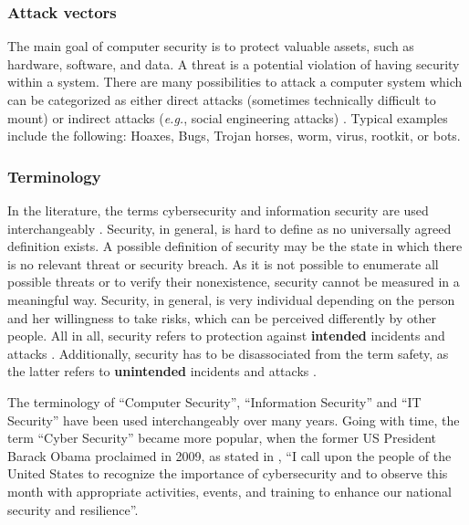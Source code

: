 \subsubsection{Attack vectors}
The main goal of computer security is to protect valuable assets, such as hardware, software, and data. A threat is a potential violation of having security within a system. There are many possibilities to attack a computer system which can be categorized as either direct attacks (sometimes technically difficult to mount) or indirect attacks (\textit{e.g.}, social engineering attacks) \cite{Bishop2003}. Typical examples include the following: Hoaxes, Bugs, Trojan horses,  worm, virus, rootkit, or bots.

\subsubsection{Terminology}
In the literature, the terms cybersecurity and information security are used interchangeably \cite{VonSolms2013}. Security, in general, is hard to define as no universally agreed definition exists. A possible definition of security may be the state in which there is no relevant threat or security breach. As it is not possible to enumerate all possible threats or to verify their nonexistence, security cannot be measured in a meaningful way. Security, in general, is very individual depending on the person and her willingness to take risks, which can be perceived differently by other people. All in all, security refers to protection against \textbf{intended} incidents and attacks \cite{Bishop2004, Pfleeger2014}. Additionally, security has to be disassociated from the term safety, as the latter refers to \textbf{unintended} incidents and attacks \cite{Bishop2004}.

The terminology of ``Computer Security'', ``Information Security'' and ``IT Security'' have been used interchangeably over many years. Going with time, the term ``Cyber Security'' became more popular, when the former US President Barack Obama proclaimed in 2009, as stated in \cite{TheWhiteHouse2009}, ``I call upon the people of the United States to recognize the importance of cybersecurity and to observe this month with appropriate activities, events, and training to enhance our national security and resilience''.









